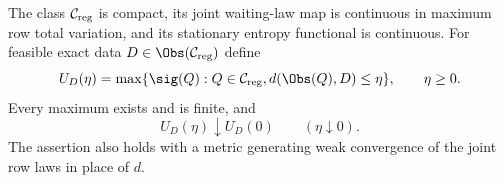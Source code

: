 \begin{proposition}
\label{prop:compact-priors}
The class $\mathcal C_{\rm reg}$ is compact, its joint waiting-law map is continuous
in maximum row total variation, and its stationary entropy functional is
continuous. For feasible exact data $D\in\Obs(\mathcal C_{\rm reg})$ define
\begin{equation}
 U_D(\eta)=\max\{\sig(Q):Q\in\mathcal C_{\rm reg},
                      d(\Obs(Q),D)\le\eta\},\qquad\eta\ge0.
 \label{eq:compact-upper}
\end{equation}
Every maximum exists and is finite, and
\begin{equation}
 U_D(\eta)\downarrow U_D(0)\qquad(\eta\downarrow0).
 \label{eq:compact-limit}
\end{equation}
The assertion also holds with a metric generating weak convergence of
the joint row laws in place of $d$.
\end{proposition}
